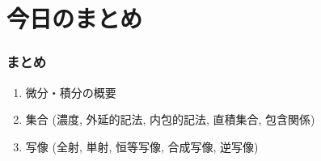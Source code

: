 




\section{今日のまとめ}
\begin{frame}
\frametitle{まとめ}   



\begin{enumerate}
\item 微分・積分の概要
\item 集合 (濃度, 外延的記法, 内包的記法, 直積集合, 包含関係)
\item 写像 (全射, 単射, 恒等写像, 合成写像, 逆写像)
\end{enumerate}


\end{frame}